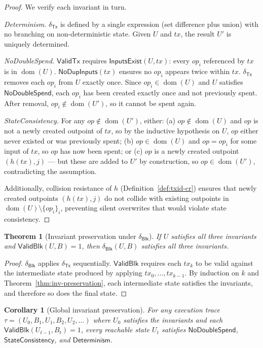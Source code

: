 \documentclass[11pt]{article}
\newtheorem{theorem}{Theorem}
\newtheorem{corollary}{Corollary}
\newcommand{\dom}{\operatorname{dom}}
\newcommand{\Tx}{\mathsf{Tx}}
\newcommand{\Blk}{\mathsf{Blk}}
\newcommand{\ValidTx}{\mathsf{ValidTx}}
\newcommand{\ValidBlk}{\mathsf{ValidBlk}}
\newcommand{\DeltaTx}{\delta_{\Tx}}
\newcommand{\DeltaBlk}{\delta_{\Blk}}
\begin{document}
\begin{proof}
We verify each invariant in turn.

\emph{Determinism.}
$\DeltaTx$ is defined by a single expression (set difference plus union) with no branching on non-deterministic state.
Given $U$ and $tx$, the result $U'$ is uniquely determined.

\emph{NoDoubleSpend.}
$\ValidTx$ requires $\textsf{InputsExist}(U,tx)$: every $op_i$ referenced by $tx$ is in $\dom(U)$.
$\textsf{NoDupInputs}(tx)$ ensures no $op_i$ appears twice within $tx$.
$\DeltaTx$ removes each $op_i$ from $U$ exactly once.
Since $op_i\in\dom(U)$ and $U$ satisfies $\textsf{NoDoubleSpend}$, each $op_i$ has been created exactly once and not previously spent.
After removal, $op_i\notin\dom(U')$, so it cannot be spent again.

\emph{StateConsistency.}
For any $op\notin\dom(U')$, either:
(a) $op\notin\dom(U)$ and $op$ is not a newly created outpoint of $tx$, so by the inductive hypothesis on $U$, $op$ either never existed or was previously spent;
(b) $op\in\dom(U)$ and $op=op_i$ for some input of $tx$, so $op$ has now been spent; or
(c) $op$ is a newly created outpoint $(h(tx),j)$ --- but these are added to $U'$ by construction, so $op\in\dom(U')$, contradicting the assumption.

Additionally, collision resistance of $h$ (Definition~\ref{def:txid-cr}) ensures that newly created outpoints $(h(tx),j)$ do not collide with existing outpoints in $\dom(U)\setminus\{op_i\}_i$, preventing silent overwrites that would violate state consistency.
\end{proof}

\begin{theorem}[Invariant preservation under $\DeltaBlk$]\label{thm:inv-blk}
If $U$ satisfies all three invariants and $\ValidBlk(U,B)=1$, then $\DeltaBlk(U,B)$ satisfies all three invariants.
\end{theorem}

\begin{proof}
$\DeltaBlk$ applies $\DeltaTx$ sequentially.
$\ValidBlk$ requires each $tx_k$ to be valid against the intermediate state produced by applying $tx_0,\dots,tx_{k-1}$.
By induction on $k$ and Theorem~\ref{thm:inv-preservation}, each intermediate state satisfies the invariants, and therefore so does the final state.
\end{proof}

\begin{corollary}[Global invariant preservation]
For any execution trace $\tau=(U_0,B_1,U_1,B_2,U_2,\dots)$ where $U_0$ satisfies the invariants and each $\ValidBlk(U_{t-1},B_t)=1$, every reachable state $U_t$ satisfies $\textsf{NoDoubleSpend}$, $\textsf{StateConsistency}$, and $\textsf{Determinism}$.
\end{corollary}
\end{document}
